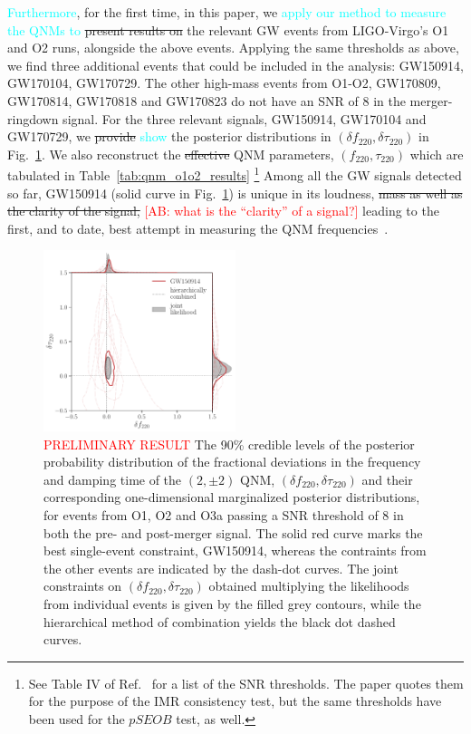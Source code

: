\documentclass[twocolumn,prd,aps,superscriptaddress,preprintnumbers,tightenlines,showpacs,nofootinbib,eqsecnum,amsfonts,amsmath]{revtex4-1}
\newcommand{\ab}[1]{\textcolor{cyan}{#1}}
\newcommand{\comment}[1]{\textcolor{red}{[#1]}}
\newcommand{\df}[1]{\delta f_{\text{#1}}}
\newcommand{\dtau}[1]{\delta \tau_{\text{#1}}}
\newcommand{\fngr}[1]{f_{\text{#1}}}
\newcommand{\taungr}[1]{\tau_{\text{#1}}}
\begin{document}
\ab{Furthermore}, for the first time, in this paper, we \ab{apply our method to 
measure the QNMs to} \sout{present results on} the relevant
GW events from LIGO-Virgo's O1 and O2 runs, alongside
the above events. Applying the same thresholds as above, we find three
additional events that could be included in the analysis: GW150914,
GW170104, GW170729. The other high-mass events from O1-O2, GW170809,
GW170814, GW170818 and GW170823 do not have an SNR of $8$ in the
merger-ringdown signal. For the three relevant signals, GW150914,
GW170104 and GW170729, we \sout{provide} \ab{show} the posterior distributions in
$(\df{220}, \dtau{220})$ in Fig.~\ref{fig:o1o2_events}. We also
reconstruct the \sout{effective} QNM parameters, $(\fngr{220}, \taungr{220})$
which are tabulated in Table~\ref{tab:qnm_o1o2_results} \footnote{See
  Table IV of Ref.~\cite{Abbott:2020jks} for a list of the SNR
  thresholds. The paper quotes them for the purpose of the IMR
  consistency test, but the same thresholds have been used for the
  $pSEOB$ test, as well.} Among all the GW signals detected so far,
GW150914 (solid curve in Fig.~\ref{fig:o1o2_events}) is unique in its
loudness, \sout{mass as well as the clarity of the signal,} \comment{AB: what 
is the ``clarity'' of a signal?} leading to the
first, and to date, best attempt in measuring the QNM frequencies~\cite{}. 

\begin{figure}[h!]
	\includegraphics[width=0.5\textwidth]{figures/rin_pseob_results_v2.pdf}
	\caption{\textcolor{red}{PRELIMINARY RESULT} The 90\% credible levels of the posterior probability distribution of the fractional deviations in the frequency and damping time of the $(2,\pm 2)$ QNM, $(\df{220},\dtau{220})$ and their corresponding one-dimensional marginalized posterior distributions, for events from O1, O2 and O3a passing a SNR threshold of $8$ in both the pre- and post-merger signal. The solid red curve marks the best single-event constraint, GW150914, whereas the contraints from the other events are indicated by the dash-dot curves. The joint constraints on $(\df{220},\dtau{220})$ obtained multiplying the likelihoods from individual events is given by the filled grey contours, while the hierarchical method of combination yields the black dot dashed curves.}
	\label{fig:o1o2_events}
\end{figure}
\end{document}
